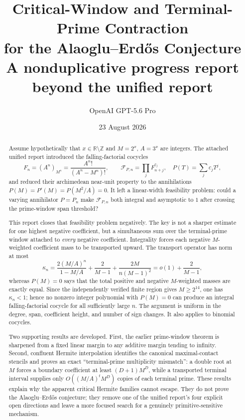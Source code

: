 \documentclass[11pt,oneside]{article}
\title{\textbf{Critical-Window and Terminal-Prime Contraction\\
for the Alaoglu--Erd\H{o}s Conjecture}\\[0.5em]
\large A nonduplicative progress report beyond the unified report}
\author{OpenAI GPT-5.6 Pro}
\date{23 August 2026}
\theoremstyle{definition}
\theoremstyle{remark}
\newcommand{\Z}{\mathbb Z}
\newcommand{\R}{\mathbb R}
\newcommand{\FF}{\mathcal F}
\begin{document}
\maketitle

\begin{abstract}
Assume hypothetically that $x\in\R\setminus\Z$ and
$M=2^x$, $A=3^x$ are integers.  The attached unified report introduced the
falling-factorial cocycles
\[
 F_n=(A^n)_{M^n}=\frac{A^n!}{(A^n-M^n)!},
 \qquad
 \FF_{P,n}=\prod_j F_{n+j}^{c_j},
 \quad P(T)=\sum_jc_jT^j,
\]
and reduced their archimedean near-unit property to the annihilations
$P(M)=P'(M)=P(M^2/A)=0$.  It left a linear-width feasibility problem:
could a varying annihilator $P=P_n$ make $\FF_{P,n}$ both integral and
asymptotic to $1$ after crossing the prime-window span threshold?

This report closes that feasibility problem negatively.  The key is not a sharper estimate
for one highest negative coefficient, but a simultaneous sum over the terminal-prime window
attached to \emph{every} negative coefficient.  Integrality forces each negative
$M$-weighted coefficient mass to be transported upward.  The transport operator has norm at
most
\[
 \kappa_n=
 \frac{2(M/A)^n}{1-M/A}+\frac{2}{M-1}
 +\frac{2M}{n(M-1)^2}=o(1)+\frac{2}{M-1},
\]
whereas $P(M)=0$ says that the total positive and negative $M$-weighted masses are exactly
equal.  Since the independently verified finite region gives $M\ge2^{14}$, one has
$\kappa_n<1$; hence no nonzero integer polynomial with $P(M)=0$ can produce an integral
falling-factorial cocycle for all sufficiently large $n$.  The argument is uniform in the
degree, span, coefficient height, and number of sign changes.  It also applies to binomial
cocycles.

Two supporting results are developed.  First, the earlier prime-window theorem is sharpened
from a fixed linear margin to any additive margin tending to infinity.  Second, confluent
Hermite interpolation identifies the canonical maximal-contact stencils and proves an exact
``terminal-prime multiplicity mismatch'': a double root at $M$ forces a boundary coefficient
at least $(D+1)M^D$, while a transported terminal interval supplies only
$O((M/A)^tM^D)$ copies of each terminal prime.  These results explain why the apparent
critical Hermite families cannot escape.  They do not prove the Alaoglu--Erd\H{o}s conjecture;
they remove one of the unified report's four explicit open directions and leave a more
focused search for a genuinely primitive-sensitive mechanism.
\end{abstract}
\end{document}
